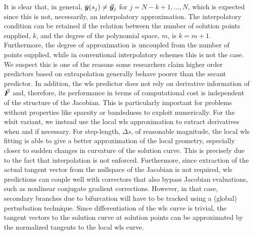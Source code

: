 It is clear that, in general,  
$\bar{\bm{y}}(s_j)\neq \vec{\bm{y}}_j$ for $j=N-k+1,\dots, N$, which is 
expected since this is not, necessarily,
an interpolatory approximation. The interpolatory
condition can be retained if the relation between the number of solution
points supplied, $k$, and the degree of the polynomial space, $m$, is $k=m+1$.
Furthermore, the degree of approximation
is uncoupled from the number of points supplied, while in conventional 
interpolatory
schemes this is not the case. We suspect this is one of the reasons some
researchers claim higher order predictors based on extrapolation generally 
behave poorer than the secant 
predictor\cite{Seydel87,Salgovic81}. In addition, the \acrshort{wls} predictor 
does
not rely on derivative information of $\vec{\bm{F}}$ and, therefore, its 
performance in
terms of computational cost is independent of the structure of the Jacobian.
This is particularly important for problems without properties like sparsity or
bandedness to exploit numerically. For the \acrshort{wlsit} variant, we instead 
use the local \acrshort{wls} approximation to extract derivatives
when and if necessary. For step-length, $\Delta s$, of reasonable magnitude, 
the local \acrshort{wls}
fitting is able to give a better approximation of the local geometry, especially
closer to sudden changes in curvature of the solution curve. This is precisely
due to the fact that interpolation is not enforced. Furthermore, since
extraction of the actual tangent vector from the nullspace of the Jacobian is 
not required, \acrshort{wls} predictions can couple well with correctors that 
also bypass
Jacobian evaluations, such as nonlinear conjugate gradient
corrections\cite{Allgower91}. However, in that case, secondary branches due to
bifurcation will have to be tracked using a (global) perturbation technique.
Since differentiation of the \acrshort{wls} curve is trivial, the tangent 
vectors to the solution curve at solution points can be approximated by the 
normalized tangents to the local \acrshort{wls} curve.

